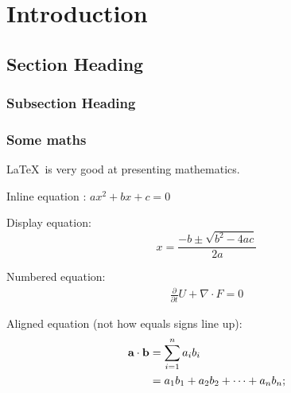 \chapter{Introduction} %
\label{cha:ch1_introduction} %

\blindtext[1] %

\section{Section Heading} %
\label{sec:section label} %

\blindtext[1]
 
\subsection{Subsection Heading} %
\label{sec:subsection label} %

\blindtext[1]

\subsection{Some maths}


\LaTeX\ is very good at presenting mathematics.

Inline equation :
$ax^2 + bx + c = 0$ %

Display equation:
$$x = \frac{-b \pm \sqrt{b^2 - 4ac}}{2a}$$ %

Numbered equation:
\begin{align}
	\label{eq:equation label} %
	\frac{\partial}{\partial t} U + \nabla \cdot F = 0
\end{align}

Aligned equation (not how equals signs line up):
\begin{align}
	\notag %
	\label{eq:dot product}
	\textbf{a} \cdot \textbf{b} &= \sum_{i=1}^n a_ib_i \\
	&= a_1b_1 + a_2b_2 + \cdots + a_nb_n; %
\end{align}

